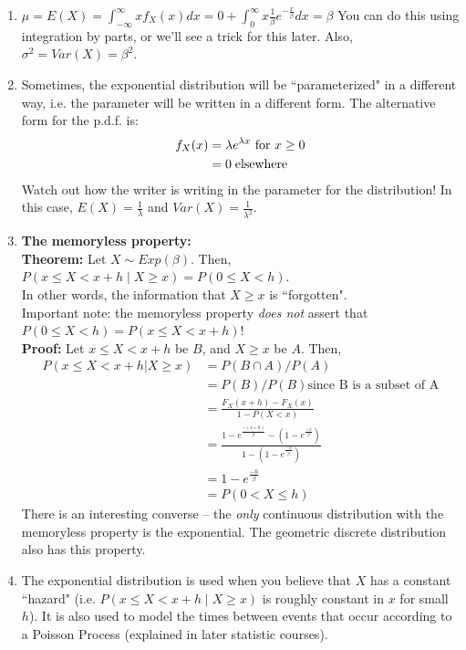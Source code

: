\documentclass[12pt]{article}
\begin{document}
\begin{enumerate}
    \item $\mu = E(X) = \int_{-\infty}^{\infty} x f_X (x) dx = 0 + \int_0^{\infty} x \frac{1}{\beta} e^{-\frac{x}{\beta}} dx = \beta$
        You can do this using integration by parts, or we'll see a trick for this later. Also, $\sigma^2 = Var(X) = \beta^2$.
    \item Sometimes, the exponential distribution will be ``parameterized" in a different way, i.e. the parameter will be written in a different form. The alternative form for the p.d.f. is:
        \begin{align*}
            f_X (x) &= \lambda e^{\lambda x} \textnormal{ for } x \geq 0 \\
                &= 0 \; \textnormal{elsewhere}
        \end{align*}
        Watch out how the writer is writing in the parameter for the distribution! In this case, $E(X) = \frac{1}{\lambda}$ and $Var(X) = \frac{1}{\lambda^2}$.
    \item \textbf{The memoryless property:} \\
        \textbf{Theorem:} Let $X \sim Exp(\beta)$. Then, $P(x \leq X < x+h \; | \; X \geq x) = P(0 \leq X < h)$. \\
        In other words, the information that $X \geq x$ is ``forgotten". \\
        Important note: the memoryless property \emph{does not} assert that $P(0 \leq X < h) = P(x \leq X < x+h)$! \\
        \textbf{Proof:} Let $x \leq X < x+h$ be $B$, and $X \geq x$ be $A$. Then,
            \begin{align*}
                P(x \leq X < x+h | X \geq x) &= P(B \cap A) / P(A) \\
                    &= P(B)/P(B) \text{since B is a subset of A} \\
                    &= \frac{F_X (x+h) - F_X (x)}{1 - P(X < x)} \\
                    &= \frac{1 - e^{\frac{-(x+h)}{\beta}} - (1 - e^{\frac{-x}{\beta}})}{1 - (1 - e^{\frac{-x}{\beta}})} \\
                    &= 1 - e^{\frac{-h}{\beta}} \\
                    &= P(0 < X \leq h)
            \end{align*}
        There is an interesting converse -- the \emph{only} continuous distribution with the memoryless property is the exponential. The geometric discrete distribution also has this property.
    \item The exponential distribution is used when you believe that $X$ has a constant ``hazard" (i.e. $P(x \leq X < x+h \; | \; X \geq x)$ is roughly constant in $x$ for small $h$). It is also used to model the times between events that occur according to a Poisson Process (explained in later statistic courses).

\end{enumerate}
\end{document}
